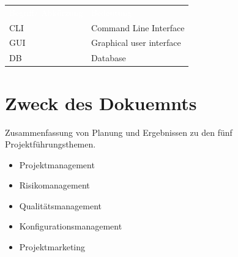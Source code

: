\documentclass[10pt,paper=a4,final]{scrartcl}
\begin{document}
\begin{tabularx}{\textwidth}{l X}
\textcolor{white}{Begriff/ Abkürzung}\cellcolor{blue!80!} & \textcolor{white}{Bedeutung}\cellcolor{blue!80!} \\
CLI \cellcolor{blue!20!} & Command Line Interface\cellcolor{blue!20!} \\
GUI \cellcolor{blue!20!} & Graphical user interface \cellcolor{blue!20!} \\
DB \cellcolor{blue!20!} & Database\cellcolor{blue!20!} \\
\end{tabularx}
\newline
\newline
\newline

{}
\flushleft
\newpage
\tableofcontents
\newpage
\section{Zweck des Dokuemnts}
Zusammenfassung von Planung und Ergebnissen zu den fünf Projektführungsthemen.
\begin{itemize}
  \item Projektmanagement
  \item Risikomanagement
  \item Qualitätsmanagement
  \item Konfigurationsmanagement
  \item Projektmarketing
\end{itemize}
\end{document}
